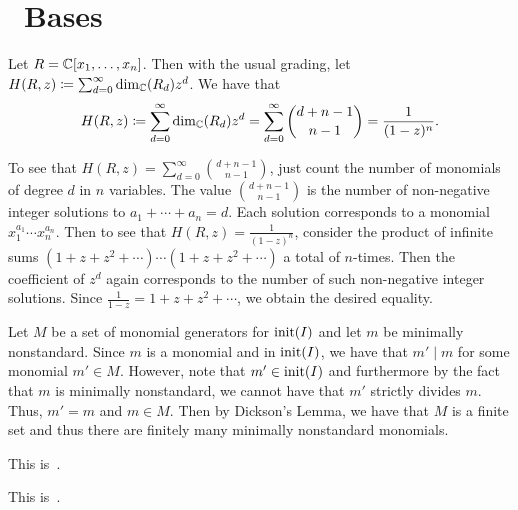 \documentclass[letterpaper, 11pt, oneside]{book}
\begin{document}
\clearpage

\section{\Grobner\ Bases}

\begin{lem}
  Let $R = \mathbb{C}[x_{1}, \ldots, x_{n}]$.
  Then with the usual grading, let $H(R, z) \coloneqq \sum_{d = 0}^{\infty} \dim_{\mathbb{C}}(R_{d}) z^{d}$.
  We have that
  \[
    H(R, z) \coloneqq \sum_{d = 0}^{\infty} \dim_{\mathbb{C}}(R_{d}) z^{d} = \sum_{d = 0}^{\infty} \binom{d + n - 1}{n - 1} = \frac{1}{(1 - z)^{n}}.
  \]
\end{lem}
\begin{sol}
  To see that $H(R, z) = \sum_{d = 0}^{\infty} \binom{d + n - 1}{n - 1}$, just count the number of monomials of degree $d$ in $n$ variables.
  The value $\binom{d + n - 1}{n - 1}$ is the number of non-negative integer solutions to $a_{1} + \cdots + a_{n} = d$.
  Each solution corresponds to a monomial $x_{1}^{a_{1}} \cdots x_{n}^{a_{n}}$.
  Then to see that $H(R, z) = \frac{1}{(1 - z)^{n}}$, consider the product of infinite sums $(1 + z + z^{2} + \cdots) \cdots (1 + z + z^{2} + \cdots)$ a total of $n$-times.
  Then the coefficient of $z^{d}$ again corresponds to the number of such non-negative integer solutions.
  Since $\frac{1}{1 - z} = 1 + z + z^{2} + \cdots$, we obtain the desired equality.
\end{sol}

\begin{sol}
  Let $M$ be a set of monomial generators for $\operatorname{init}(I)$ and let $m$ be minimally nonstandard.
  Since $m$ is a monomial and in $\operatorname{init}(I)$, we have that $m' \mid m$ for some monomial $m' \in M$.
  However, note that $m' \in \operatorname{init}(I)$ and furthermore by the fact that $m$ is minimally nonstandard, we cannot have that $m'$ strictly divides $m$.
  Thus, $m' = m$ and $m \in M$.
  Then by Dickson's Lemma, we have that $M$ is a finite set and thus there are finitely many minimally nonstandard monomials.
\end{sol}

\begin{sol}
  This is~\cite[Chapter 2, \S 7, Theorem 5]{book:IVA}.
\end{sol}

\begin{sol}
  This is~\cite[Chapter 3, \S 1, Theorem 2]{book:IVA}.
\end{sol}
\end{document}
